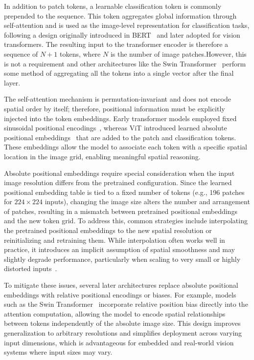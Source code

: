 \documentclass[runningheads,a4paper]{llncs}
\begin{document}
In addition to patch tokens, a learnable classification token is commonly prepended to the sequence. This token aggregates global information through self-attention and is used as the image-level representation for classification tasks, following a design originally introduced in BERT~\cite{devlin2019bert} and later adopted for vision transformers. The resulting input to the transformer encoder is therefore a sequence of $N+1$ tokens, where $N$ is the number of image patches.However, this is not a requirement and other architectures like the Swin Transformer~\cite{liu2021swin} perform some method of aggregating all the tokens into a single vector after the final layer.

The self-attention mechanism is permutation-invariant and does not encode spatial order by itself; therefore, positional information must be explicitly injected into the token embeddings. Early transformer models employed fixed sinusoidal positional encodings~\cite{vaswani2017attention}, whereas ViT introduced learned absolute positional embeddings~\cite{dosovitskiy2021vit} that are added to the patch and classification tokens. These embeddings allow the model to associate each token with a specific spatial location in the image grid, enabling meaningful spatial reasoning.

Absolute positional embeddings require special consideration when the input image resolution differs from the pretrained configuration. Since the learned positional embedding table is tied to a fixed number of tokens (e.g., 196 patches for $224\times224$ inputs), changing the image size alters the number and arrangement of patches, resulting in a mismatch between pretrained positional embeddings and the new token grid. To address this, common strategies include interpolating the pretrained positional embeddings to the new spatial resolution or reinitializing and retraining them. While interpolation often works well in practice, it introduces an implicit assumption of spatial smoothness and may slightly degrade performance, particularly when scaling to very small or highly distorted inputs~\cite{ranftl2021dpt,bolya2024window_attention}.

To mitigate these issues, several later architectures replace absolute positional embeddings with relative positional encodings or biases. For example, models such as the Swin Transformer~\cite{liu2021swin} incorporate relative position bias directly into the attention computation, allowing the model to encode spatial relationships between tokens independently of the absolute image size. This design improves generalization to arbitrary resolutions and simplifies deployment across varying input dimensions, which is advantageous for embedded and real-world vision systems where input sizes may vary.
\end{document}
